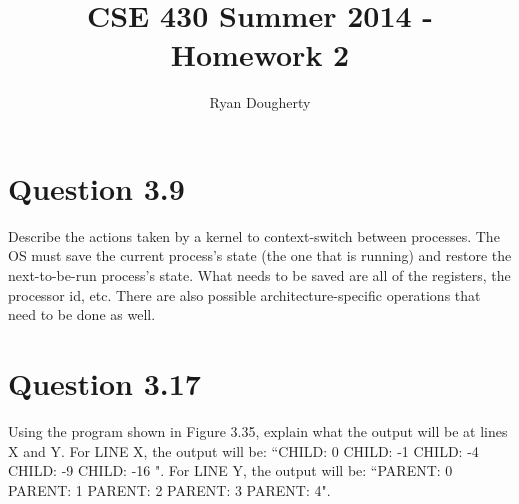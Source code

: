 \documentclass[12pt]{article}
\title{CSE 430 Summer 2014 - Homework 2}
\author{Ryan Dougherty}
\date{}                                           %
\begin{document}
\maketitle

\section*{Question 3.9} {\color{blue}Describe the actions taken by a kernel to context-switch between processes.}
The OS must save the current process's state (the one that is running) and restore the next-to-be-run process's state. What needs to be saved are all of the registers, the processor id, etc. There are also possible architecture-specific operations that need to be done as well.

\section*{Question 3.17} {\color{blue}Using the program shown in Figure 3.35, explain what the output will be at lines X and Y.} For LINE X, the output will be: ``CHILD: 0 CHILD: -1 CHILD: -4 CHILD: -9 CHILD: -16 ". For LINE Y, the output will be: ``PARENT: 0 PARENT: 1 PARENT: 2 PARENT: 3 PARENT: 4".
\end{document}
